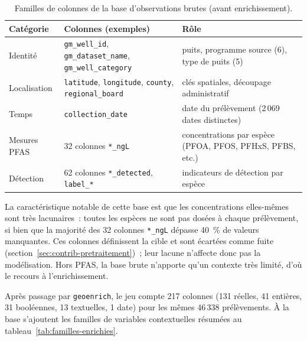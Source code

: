 \begin{table}[h!]
    \centering
    \caption{Familles de colonnes de la base d'observations brutes (avant enrichissement).}
    \label{tab:base-brute}
    \small
    \begin{tabular}{l p{5.3cm} p{4.6cm}}
        \hline
        Cat\'egorie & Colonnes (exemples) & R\^ole \\
        \hline
        Identit\'e & \texttt{gm\_well\_id}, \texttt{gm\_dataset\_name}, \texttt{gm\_well\_category} & puits, programme source (6), type de puits (5) \\
        Localisation & \texttt{latitude}, \texttt{longitude}, \texttt{county}, \texttt{regional\_board} & cl\'es spatiales, d\'ecoupage administratif \\
        Temps & \texttt{collection\_date} & date du pr\'el\`evement (2\,069 dates distinctes) \\
        Mesures PFAS & 32 colonnes \texttt{*\_ngL} & concentrations par esp\`ece (PFOA, PFOS, PFHxS, PFBS, etc.) \\
        D\'etection & 62 colonnes \texttt{*\_detected}, \texttt{label\_*} & indicateurs de d\'etection par esp\`ece \\
        \hline
    \end{tabular}
\end{table}

La caract\'eristique notable de cette base est que les concentrations elles-m\^emes sont tr\`es lacunaires~: toutes les esp\`eces ne sont pas dos\'ees \`a chaque pr\'el\`evement, si bien que la majorit\'e des 32 colonnes \texttt{*\_ngL} d\'epasse 40~\% de valeurs manquantes. Ces colonnes d\'efinissent la cible et sont \'ecart\'ees comme fuite (section~\ref{sec:contrib-pretraitement})~; leur lacune n'affecte donc pas la mod\'elisation. Hors PFAS, la base brute n'apporte qu'un contexte tr\`es limit\'e, d'o\`u le recours \`a l'enrichissement.

\label{sec:geoenrich-dataset-enrichi}

Apr\`es passage par \texttt{geoenrich}, le jeu compte 217 colonnes (131 r\'eelles, 41 enti\`eres, 31 bool\'eennes, 13 textuelles, 1 date) pour les m\^emes 46\,338 pr\'el\`evements. \`A la base s'ajoutent les familles de variables contextuelles r\'esum\'ees au tableau~\ref{tab:familles-enrichies}.

